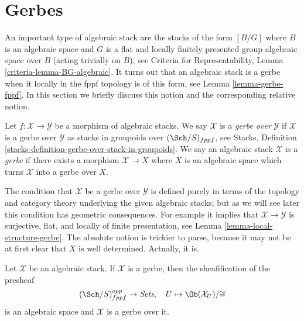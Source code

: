 \section{Gerbes}
\label{section-gerbes}

\noindent
An important type of algebraic stack are the stacks of the
form $[B/G]$ where $B$ is an algebraic space and $G$ is a flat
and locally finitely presented group algebraic space over $B$
(acting trivially on $B$), see
Criteria for Representability, Lemma \ref{criteria-lemma-BG-algebraic}.
It turns out that an algebraic stack is a gerbe when it locally in the
fppf topology is of this form, see
Lemma \ref{lemma-gerbe-fppf}.
In this section we briefly discuss this notion and the corresponding
relative notion.

\begin{definition}
\label{definition-gerbe}
Let $f : \mathcal{X} \to \mathcal{Y}$ be a morphism of algebraic stacks.
We say $\mathcal{X}$ is a {\it gerbe over} $\mathcal{Y}$ if
$\mathcal{X}$ is a gerbe over $\mathcal{Y}$ as stacks
in groupoids over $(\Sch/S)_{fppf}$, see
Stacks, Definition \ref{stacks-definition-gerbe-over-stack-in-groupoids}.
We say an algebraic stack $\mathcal{X}$ is a {\it gerbe} if there exists
a morphism $\mathcal{X} \to X$ where $X$ is an algebraic space which
turns $\mathcal{X}$ into a gerbe over $X$.
\end{definition}

\noindent
The condition that $\mathcal{X}$ be a gerbe over $\mathcal{Y}$ is defined
purely in terms of the topology and category theory underlying the given
algebraic stacks; but as we will see later this condition has
geometric consequences. For example it implies that
$\mathcal{X} \to \mathcal{Y}$ is surjective, flat, and
locally of finite presentation, see
Lemma \ref{lemma-local-structure-gerbe}.
The absolute notion is trickier to parse, because it
may not be at first clear that $X$ is well determined. Actually, it is.

\begin{lemma}
\label{lemma-gerbe-over-iso-classes}
Let $\mathcal{X}$ be an algebraic stack. If $\mathcal{X}$ is a gerbe, then
the sheafification of the presheaf
$$
(\Sch/S)_{fppf}^{opp} \to \textit{Sets}, \quad
U \mapsto \Ob(\mathcal{X}_U)/\!\!\cong
$$
is an algebraic space and $\mathcal{X}$ is a gerbe over it.
\end{lemma}

